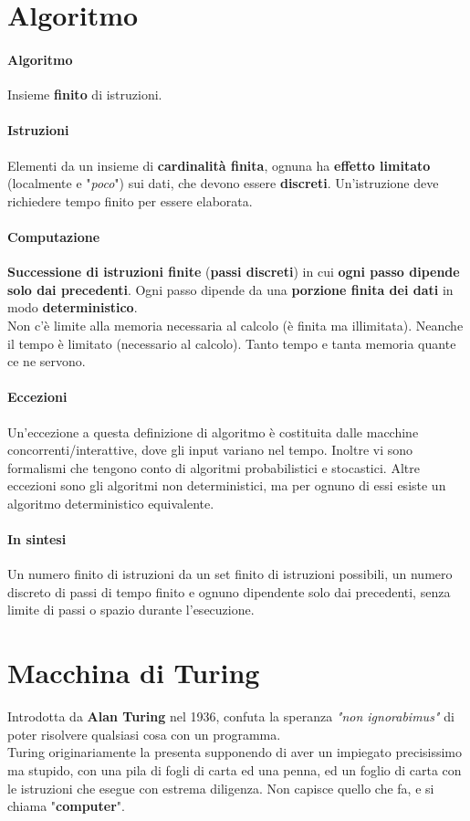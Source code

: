 \documentclass[10pt]{book}
\begin{document}
\section{Algoritmo}
\paragraph{Algoritmo} Insieme \textbf{finito} di istruzioni.
\paragraph{Istruzioni} Elementi da un insieme di \textbf{cardinalità finita}, ognuna ha \textbf{effetto limitato} (localmente e "\textit{poco}") sui dati, che devono essere \textbf{discreti}. Un'istruzione deve richiedere tempo finito per essere elaborata.
\paragraph{Computazione} \textbf{Successione di istruzioni finite} (\textbf{passi discreti}) in cui \textbf{ogni passo dipende solo dai precedenti}. Ogni passo dipende da una \textbf{porzione finita dei dati} in modo \textbf{deterministico}.\\
Non c'è limite alla memoria necessaria al calcolo (è finita ma illimitata). Neanche il tempo è limitato (necessario al calcolo). Tanto tempo e tanta memoria quante ce ne servono.
\paragraph{Eccezioni} Un'eccezione a questa definizione di algoritmo è costituita dalle macchine concorrenti/interattive, dove gli input variano nel tempo. Inoltre vi sono formalismi che tengono conto di algoritmi probabilistici e stocastici. Altre eccezioni sono gli algoritmi non deterministici, ma per ognuno di essi esiste un algoritmo deterministico equivalente.
\paragraph{In sintesi} Un numero finito di istruzioni da un set finito di istruzioni possibili, un numero discreto di passi di tempo finito e ognuno dipendente solo dai precedenti, senza limite di passi o spazio durante l'esecuzione.
\pagebreak
\section{Macchina di Turing}
Introdotta da \textbf{Alan Turing} nel 1936, confuta la speranza \textit{"non ignorabimus"} di poter risolvere qualsiasi cosa con un programma.\\
Turing originariamente la presenta supponendo di aver un impiegato precisissimo ma stupido, con una pila di fogli di carta ed una penna, ed un foglio di carta con le istruzioni che esegue con estrema diligenza. Non capisce quello che fa, e si chiama "\textbf{computer}".
\end{document}
